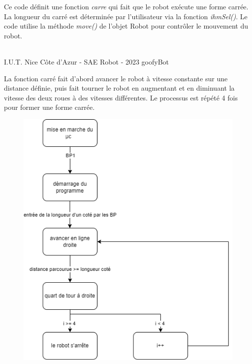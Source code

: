 Ce code définit une fonction \emph{carre} qui fait que le robot exécute une forme carrée. La longueur du carré est déterminée par l'utilisateur via la fonction \emph{ihmSel()}. Le code utilise la méthode \emph{move()} de l'objet Robot pour contrôler le mouvement du robot. 

\vfill
\noindent\makebox[\linewidth]{\rule{.8\paperwidth}{.6pt}}\\[0.2cm]
I.U.T. Nice Côte d'Azur - SAE Robot - 2023 \hfill goofyBot
\noindent\makebox[\linewidth]{\rule{.8\paperwidth}{.6pt}}
\newpage

La fonction carré fait d'abord avancer le robot à vitesse constante sur une distance définie, puis fait tourner le robot en augmentant et en diminuant la vitesse des deux roues à des vitesses différentes. Le processus est répété 4 fois pour former une forme carrée.

\begin{figure}[H]
\centering
\begin{minipage}{.5\textwidth}
  \centering
  \centerline{\includegraphics[width=1\linewidth]{img/mae/carre.png}}
  \label{fig:maecarre}
\end{minipage}%
\end{figure}

